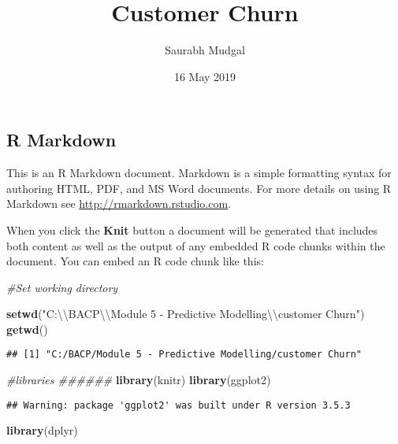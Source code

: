 \documentclass[]{article}
\title{Customer Churn}
\author{Saurabh Mudgal}
\date{16 May 2019}
\newenvironment{Shaded}{\begin{snugshade}}{\end{snugshade}}
\newcommand{\KeywordTok}[1]{\textcolor[rgb]{0.13,0.29,0.53}{\textbf{#1}}}
\newcommand{\CharTok}[1]{\textcolor[rgb]{0.31,0.60,0.02}{#1}}
\newcommand{\StringTok}[1]{\textcolor[rgb]{0.31,0.60,0.02}{#1}}
\newcommand{\CommentTok}[1]{\textcolor[rgb]{0.56,0.35,0.01}{\textit{#1}}}
\newcommand{\NormalTok}[1]{#1}
\begin{document}
\maketitle

\subsection{R Markdown}\label{r-markdown}

This is an R Markdown document. Markdown is a simple formatting syntax
for authoring HTML, PDF, and MS Word documents. For more details on
using R Markdown see \url{http://rmarkdown.rstudio.com}.

When you click the \textbf{Knit} button a document will be generated
that includes both content as well as the output of any embedded R code
chunks within the document. You can embed an R code chunk like this:

\begin{Shaded}
\begin{Highlighting}[]
\CommentTok{#Set working directory}

\KeywordTok{setwd}\NormalTok{(}\StringTok{"C:}\CharTok{\textbackslash{}\textbackslash{}}\StringTok{BACP}\CharTok{\textbackslash{}\textbackslash{}}\StringTok{Module 5 - Predictive Modelling}\CharTok{\textbackslash{}\textbackslash{}}\StringTok{customer Churn"}\NormalTok{)}
\KeywordTok{getwd}\NormalTok{()}
\end{Highlighting}
\end{Shaded}

\begin{verbatim}
## [1] "C:/BACP/Module 5 - Predictive Modelling/customer Churn"
\end{verbatim}

\begin{Shaded}
\begin{Highlighting}[]
\CommentTok{#libraries ######}
\KeywordTok{library}\NormalTok{(knitr)}
\KeywordTok{library}\NormalTok{(ggplot2)}
\end{Highlighting}
\end{Shaded}

\begin{verbatim}
## Warning: package 'ggplot2' was built under R version 3.5.3
\end{verbatim}

\begin{Shaded}
\begin{Highlighting}[]
\KeywordTok{library}\NormalTok{(dplyr)}
\end{Highlighting}
\end{Shaded}
\end{document}
